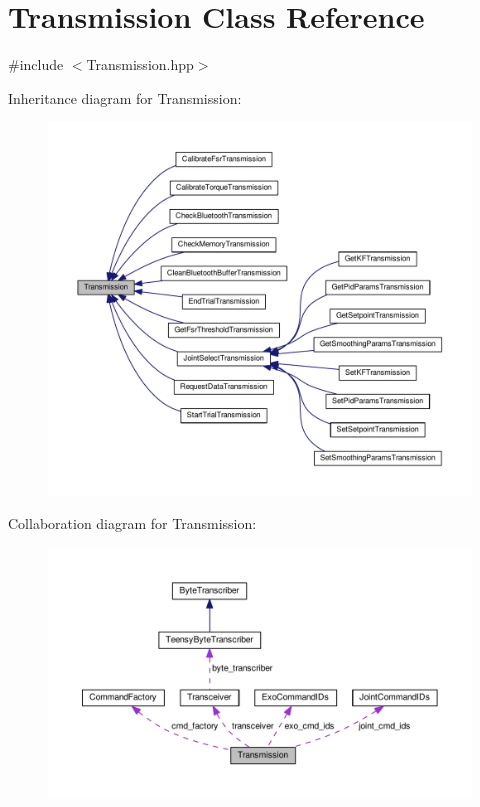 \hypertarget{classTransmission}{}\section{Transmission Class Reference}
\label{classTransmission}


{\ttfamily \#include $<$Transmission.\+hpp$>$}



Inheritance diagram for Transmission\+:\nopagebreak
\begin{figure}[H]
\begin{center}
\leavevmode
\includegraphics[width=350pt]{classTransmission__inherit__graph}
\end{center}
\end{figure}


Collaboration diagram for Transmission\+:\nopagebreak
\begin{figure}[H]
\begin{center}
\leavevmode
\includegraphics[width=350pt]{classTransmission__coll__graph}
\end{center}
\end{figure}
